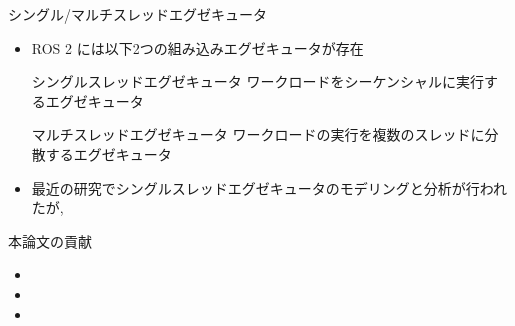 \begin{frame}{シングル/マルチスレッドエグゼキュータ}
    \begin{itemize}
        \item ROS 2 には以下2つの組み込みエグゼキュータが存在
            \begin{block}{シングルスレッドエグゼキュータ}
                ワークロードをシーケンシャルに実行するエグゼキュータ
            \end{block}
            \begin{block}{マルチスレッドエグゼキュータ}
                ワークロードの実行を複数のスレッドに分散するエグゼキュータ
            \end{block}
        \vspace{5mm}
        \item 最近の研究でシングルスレッドエグゼキュータのモデリングと分析が行われたが, 
    \end{itemize}
\end{frame}

\begin{frame}{本論文の貢献}
    \begin{itemize}
        \item {}
        \item {}
        \item {}
    \end{itemize}
\end{frame}
